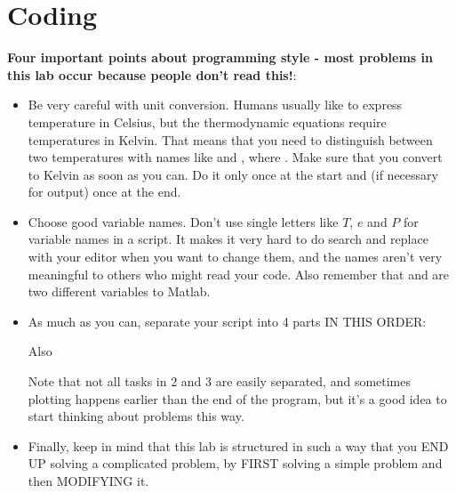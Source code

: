 \documentclass[letterpaper]{article}
\begin{document}

\section{Coding}
\label{sec:coding}

{\bf Four important points about programming style - most problems in this lab occur because
people don't read this!}:
\begin{itemize}
\item Be very careful with unit conversion.  Humans usually like to express temperature in Celsius,
but the thermodynamic equations require temperatures in Kelvin.  
That means that you need to distinguish between two temperatures
with names like  and , where
.  Make sure that you convert to Kelvin as soon as you can. 
Do it only once at the start and (if necessary for output) once at the end.

\item Choose good variable names. Don't use single letters like $T$, $e$ and $P$ for variable names
in a script.  It makes it very hard to do search and replace with your editor when you
want to change them, and the names aren't very meaningful to others who might read your code.  
Also remember that
 and  are two different variables to Matlab. 

\item As much as you can, separate your script into 4 parts IN THIS ORDER: 


Also



Note that not all tasks in 2 and 3 are
easily separated, and sometimes plotting happens earlier than the end of the program, but it's a good idea to start thinking
about problems this way.

\item Finally, keep in mind that this lab is structured in such a way that you END UP solving a complicated problem, by FIRST solving a simple problem and then MODIFYING it. 

\end{itemize}
\end{document}
